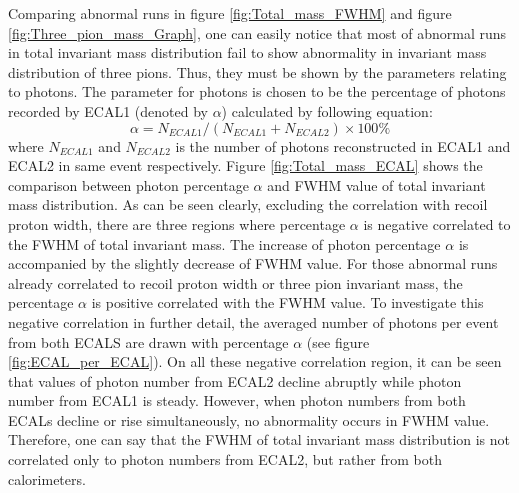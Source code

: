 Comparing abnormal runs in figure \ref{fig:Total_mass_FWHM} and figure \ref{fig:Three_pion_mass_Graph}, one can easily notice that most of abnormal runs in total invariant mass distribution fail to show abnormality in invariant mass distribution of three pions. Thus, they must be shown by the parameters relating to photons. The parameter for photons is chosen to be the percentage of photons recorded by ECAL1 (denoted by $\alpha$) calculated by following equation:
\begin{equation}
\alpha = N_{ECAL1}/\left(N_{ECAL1}+N_{ECAL2}\right) \times 100\%
\end{equation}
where $N_{ECAL1}$ and $N_{ECAL2}$ is the number of photons reconstructed in ECAL1 and ECAL2 in same event respectively. Figure \ref{fig:Total_mass_ECAL} shows the comparison between photon percentage $\alpha$ and FWHM value of total invariant mass distribution. As can be seen clearly, excluding the correlation with recoil proton width, there are three regions where percentage $\alpha$ is negative correlated to the FWHM of total invariant mass. The increase of photon percentage $\alpha$ is accompanied by the slightly decrease of FWHM value. For those abnormal runs already correlated to recoil proton width or three pion invariant mass, the percentage $\alpha$ is positive correlated with the FWHM value. To investigate this negative correlation in further detail, the averaged number of photons per event from both ECALS are drawn with percentage $\alpha$ (see figure \ref{fig:ECAL_per_ECAL}). On all these negative correlation region, it can be seen that values of photon number from ECAL2 decline abruptly while photon number from ECAL1 is steady. However, when photon numbers from both ECALs decline or rise simultaneously, no abnormality occurs in FWHM value. Therefore, one can say that the FWHM of total invariant mass distribution is not correlated only to photon numbers from ECAL2, but rather from both calorimeters.
